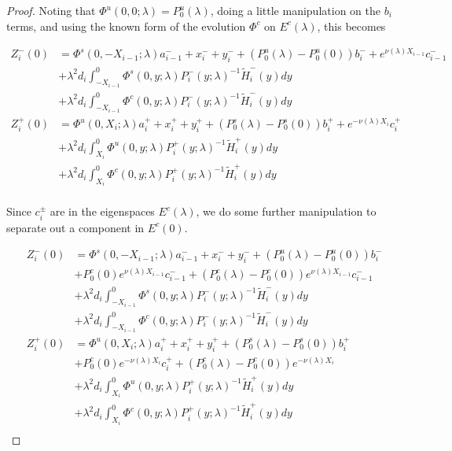\documentclass[thesis.tex]{subfiles}
\begin{document}
\begin{lemma}
\begin{proof}
Noting that $\Phi^u(0, 0; \lambda) = P_0^u(\lambda)$, doing a little manipulation on the $b_i$ terms, and using the known form of the evolution $\Phi^c$ on $E^c(\lambda)$, this becomes

\begin{align*}
Z_i^-(0) &= \Phi^s(0, -X_{i-1}; \lambda) a_{i-1}^- + x_i^- + y_i^- + (P_0^u(\lambda) - P_0^u(0))b_i^- + e^{\nu(\lambda) X_{i-1}} c_{i-1}^- \\
&+ \lambda^2 d_i \int_{-X_{i-1}}^0 \Phi^s(0, y; \lambda) P_i^-(y; \lambda)^{-1} \tilde{H}_i^-(y) dy \\
&+ \lambda^2 d_i \int_{-X_{i-1}}^0 \Phi^c(0, y; \lambda) P_i^-(y; \lambda)^{-1} \tilde{H}_i^-(y) dy  \\ 
Z_i^+(0) &= \Phi^u(0, X_i; \lambda) a_i^+ + x_i^+ + y_i^+ + (P_0^s(\lambda) - P_0^s(0)) b_i^+ + e^{-\nu(\lambda)X_i} c_i^+ \\
&+ \lambda^2 d_i \int_{X_i}^0 \Phi^u(0, y; \lambda) P_i^+(y; \lambda)^{-1} \tilde{H}_i^+(y) dy \\
&+ \lambda^2 d_i \int_{X_i}^0 \Phi^c(0, y; \lambda) P_i^+(y; \lambda)^{-1} \tilde{H}_i^+(y) dy \\
\end{align*}

Since $c_i^\pm$ are in the eigenspaces $E^c(\lambda)$, we do some further manipulation to separate out a component in $E^c(0)$.

\begin{align*}
Z_i^-(0) &= \Phi^s(0, -X_{i-1}; \lambda) a_{i-1}^- + x_i^- + y_i^- + (P_0^u(\lambda) - P_0^u(0))b_i^- \\
&+ P_0^c(0) e^{\nu(\lambda) X_{i-1}} c_{i-1}^- + (P_0^c(\lambda) - P_0^c(0)) e^{\nu(\lambda) X_{i-1}} c_{i-1}^- \\
&+ \lambda^2 d_i \int_{-X_{i-1}}^0 \Phi^s(0, y; \lambda) P_i^-(y; \lambda)^{-1} \tilde{H}_i^-(y) dy \\
&+ \lambda^2 d_i \int_{-X_{i-1}}^0 \Phi^c(0, y; \lambda) P_i^-(y; \lambda)^{-1} \tilde{H}_i^-(y) dy  \\ 
Z_i^+(0) &= \Phi^u(0, X_i; \lambda) a_i^+ + x_i^+ + y_i^+ + (P_0^s(\lambda) - P_0^s(0)) b_i^+ \\
&+ P_0^c(0) e^{-\nu(\lambda)X_i} c_i^+ + (P_0^c(\lambda) - P_0^c(0)) e^{-\nu(\lambda)X_i} \\
&+ \lambda^2 d_i \int_{X_i}^0 \Phi^u(0, y; \lambda) P_i^+(y; \lambda)^{-1} \tilde{H}_i^+(y) dy \\
&+ \lambda^2 d_i \int_{X_i}^0 \Phi^c(0, y; \lambda) P_i^+(y; \lambda)^{-1} \tilde{H}_i^+(y) dy \\
\end{align*}


\end{proof}
\end{lemma}
\end{document}
